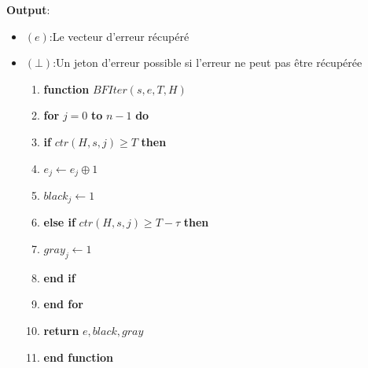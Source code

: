 \documentclass[12pt,openany]{report}
\begin{document}
\textbf{Output}:\begin{itemize}
  \item[] $(e)$:Le vecteur d'erreur récupéré
  \item[] $(\bot)$:Un jeton d'erreur possible si l'erreur ne peut pas être récupérée
  
  \begin{enumerate}
  \item \textbf{function} $BFIter(s,e,T,\mathit{H})$
  \item \hspace{0.5cm} \textbf{for} $j=0$ \textbf{to} $n-1$ \textbf{do}
  \item \hspace{0.9cm} \textbf{if} $ctr(\mathit{H},s,j)\geq T$ \textbf{then}
  \item \hspace{1.3cm} $e_j \gets e_j \oplus 1$
  \item \hspace{1.3cm} $black_j \gets 1$
  \item \hspace{0.9cm} \textbf{else if} $ctr(\mathit{H},s,j)\geq T-\tau$ \textbf{then}
  \item \hspace{1.3cm} $gray_j \gets 1$
  \item \hspace{0.9cm} \textbf{end if}
  \item \hspace{0.5cm} \textbf{end for}
  \item \hspace{0.2cm} \textbf{return}\hspace{0.2cm} $e,black,gray$
  \item \textbf{end function}
  

\end{enumerate}
\end{itemize}
\end{document}
